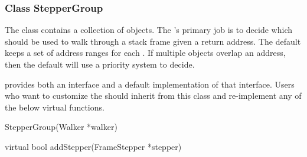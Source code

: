 \subsubsection{Class StepperGroup}
\label{subsec:steppergroup}

The  class contains a collection of  objects. The
's primary job is to decide which  should be used to
walk through a stack frame given a return address. The default 
keeps a set of address ranges for each . If multiple 
objects overlap an address, then the default  will use a priority
system to decide.

 provides both an interface and a default implementation of that
interface. Users who want to customize the  should inherit from this
class and re-implement any of the below virtual functions.

\begin{apient}
StepperGroup(Walker *walker)
\end{apient}

\begin{apient}
virtual bool addStepper(FrameStepper *stepper)
\end{apient}


